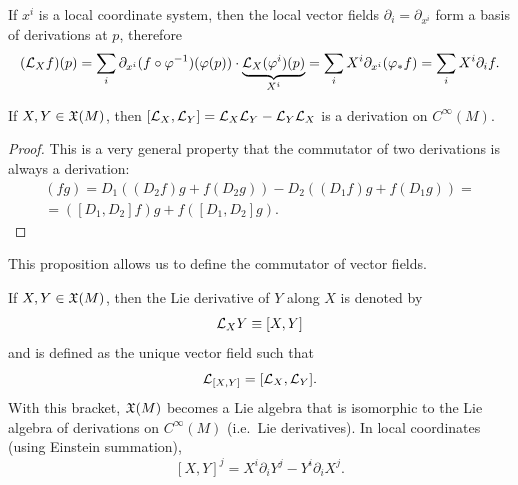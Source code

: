 \begin{cor}
If $x^i$ is a local coordinate system, then the local vector fields $\partial_i=\partial_{x^i}$ form a basis of derivations at $p$, therefore 
\[(\mathcal{L}_X f)(p)=\sum_i \partial_{x^i}(f\circ\varphi^{-1})(\varphi(p))\cdot \underbrace{\mathcal{L}_X (\varphi^i)(p)}_{X^i}=\sum_i X^i \partial_{x^i}(\varphi_\ast f)=\sum_i X^i \partial_{i} f.\]
\end{cor}

\begin{prop}
If $X,Y\in\mathfrak{X}(M)$, then $[\mathcal{L}_X,\mathcal{L}_Y]=\mathcal{L}_X\mathcal{L}_Y-\mathcal{L}_Y\mathcal{L}_X$ is a derivation on $C^\infty(M)$.
\end{prop}
\begin{proof}
    This is a very general property that the commutator of two derivations is always a derivation:
    \begin{multline}
        [D_1,D_2](fg)=D_1((D_2f)g+f(D_2g))-D_2((D_1f)g+f(D_1g))=\\=([D_1,D_2]f)g+f([D_1,D_2]g).
    \end{multline}
\end{proof}

This proposition allows us to define the commutator of vector fields.

\begin{defn}
If $X,Y\in\mathfrak{X}(M)$, then the Lie derivative of $Y$ along $X$ is denoted by 
\[\mathcal{L}_X Y\equiv [X,Y]\] and is defined as the unique vector field such that
\[\mathcal{L}_{[X,Y]}=[\mathcal{L}_X,\mathcal{L}_Y].\]
With this bracket, $\mathfrak{X}(M)$ becomes a Lie algebra that is isomorphic to the Lie algebra of derivations on $C^\infty(M)$ (i.e.\ Lie derivatives).
In local coordinates (using Einstein summation),
\[[X,Y]^j=X^i \partial_i Y^j-Y^i \partial_i X^j.\label{eq Lie derivative in components}\]
\end{defn}


